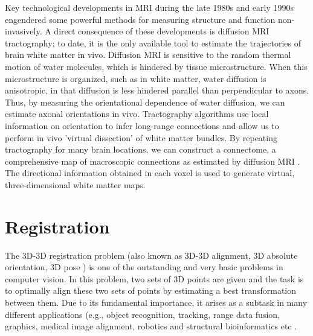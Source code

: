 \documentclass[../structure.tex]{subfiles}
\begin{document}
		Key technological developments in MRI during the late 1980s and early 1990s engendered some powerful methods for measuring structure and function non-invasively. A direct consequence of these developments is diffusion MRI tractography; to date, it is the only available tool to estimate the trajectories of brain white matter in vivo. Diffusion MRI is sensitive to the random thermal motion of water molecules, which is hindered by tissue microstructure. When this microstructure is organized, such as in white matter, water diffusion is anisotropic, in that diffusion is less hindered parallel than perpendicular to axons. Thus, by measuring the orientational dependence of water diffusion, we can estimate axonal orientations in vivo. Tractography algorithms use local information on orientation to infer long-range connections and allow us to perform in vivo 'virtual dissection' of white matter bundles. By repeating tractography for many brain locations, we can construct a connectome, a comprehensive map of macroscopic connections as estimated by diffusion MRI \cite{Jbabdi2015a}.
		The directional information obtained in each voxel is used to generate virtual, three-dimensional white matter maps\cite{Yogarajah2009}.
	\section{Registration}
	The 3D-3D registration problem (also known as 3D-3D alignment, 3D absolute orientation, 3D pose ) is one of the outstanding and very basic problems in computer vision. In this problem, two sets of 3D points are given and the task is to optimally align these two sets of points by estimating a best transformation between them. Due to its fundamental importance, it arises as a subtask in many different applications (e.g., object recognition, tracking, range data fusion, graphics, medical image alignment, robotics and structural bioinformatics etc \cite{Li2007}.
\end{document}
